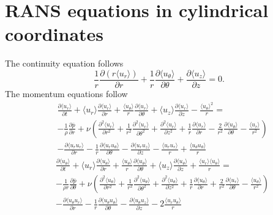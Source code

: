 \documentclass[oneside,a4paper,11pt]{report}
\newcommand{\pavg}{\overline{p}}
\begin{document}
 \chapter{RANS equations in cylindrical coordinates}
%
The continuity equation follows
\begin{equation}
\frac{1}{r} \frac{\partial \left ( r \langle u_r \rangle \right )}{\partial r} + \frac{1}{r} \frac{\partial \langle u_\theta \rangle}{\partial \theta} + \frac{\partial \langle u_z \rangle}{\partial z} = 0.
\end{equation} 
The momentum equations follow
\begin{align}
&\frac{\partial \langle u_r \rangle}{\partial t} + \langle u_r \rangle \frac{\partial \langle u_r \rangle}{\partial r} + \frac{\langle u_\theta \rangle}{r} \frac{\partial \langle u_r \rangle}{\partial \theta} + \langle u_z \rangle \frac{\partial \langle u_r \rangle}{\partial z} - \frac{\langle u_\theta \rangle^2}{r} = \nonumber \\ 
&-\frac{1}{\rho} \frac{\partial \pavg}{\partial r} + \nu \left ( \frac{\partial^2 \langle u_r \rangle}{\partial r^2} + \frac{1}{r^2} \frac{\partial^2 \langle u_r \rangle}{\partial \theta^2} + \frac{\partial^2 \langle u_r \rangle}{\partial z^2} + \frac{1}{r} \frac{\partial \langle u_r \rangle}{\partial r} - \frac{2}{r^2} \frac{\partial \langle u_\theta \rangle }{\partial \theta} - \frac{\langle u_r \rangle}{r^2} \right ) \nonumber \\
&- \frac{\partial \langle u_ru_r \rangle}{\partial r} - \frac{1}{r} \frac{\partial \langle u_r u_\theta \rangle}{\partial \theta} - \frac{\partial \langle u_r u_z \rangle}{\partial z} - \frac{\langle u_ru_r \rangle}{r} + \frac{\langle u_\theta u_\theta \rangle}{r}
\end{align} 
\begin{align}
&\frac{\partial \langle u_\theta \rangle}{\partial t} + \langle u_r \rangle \frac{\partial \langle u_\theta \rangle}{\partial r} + \frac{\langle u_\theta \rangle}{r} \frac{\partial \langle u_\theta \rangle}{\partial \theta} + \langle u_z \rangle \frac{\partial \langle u_\theta \rangle}{\partial z} + \frac{\langle u_r \rangle \langle u_\theta\rangle}{r} = \nonumber \\ 
&-\frac{1}{\rho r} \frac{\partial \pavg}{\partial \theta} + \nu \left ( \frac{\partial^2 \langle u_\theta \rangle}{\partial r^2} + \frac{1}{r^2} \frac{\partial^2 \langle u_\theta \rangle}{\partial \theta^2} + \frac{\partial^2 \langle u_\theta \rangle}{\partial z^2} + \frac{1}{r} \frac{\partial \langle u_\theta \rangle}{\partial r} + \frac{2}{r^2} \frac{\partial \langle u_r \rangle }{\partial \theta} - \frac{\langle u_\theta \rangle}{r^2} \right ) \nonumber \\
&- \frac{\partial \langle u_\theta u_r \rangle}{\partial r} - \frac{1}{r} \frac{\partial \langle u_\theta u_\theta \rangle}{\partial \theta} - \frac{\partial \langle u_\theta u_z \rangle}{\partial z} - 2\frac{\langle u_ru_\theta \rangle}{r}
\end{align} 
\end{document}
